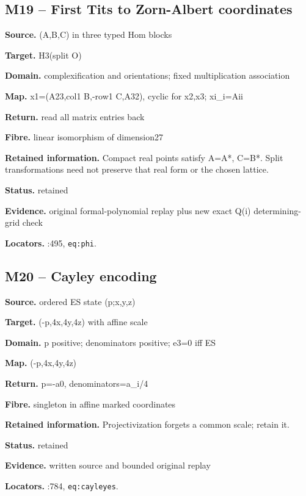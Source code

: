 \subsection*{M19 -- First Tits to Zorn-Albert coordinates}
\noindent\textbf{Source.} (A,B,C) in three typed Hom blocks\par
\noindent\textbf{Target.} H3(split O)\par
\noindent\textbf{Domain.} complexification and orientations; fixed multiplication association\par
\noindent\textbf{Map.} x1=(A23,col1 B,-row1 C,A32), cyclic for x2,x3; xi\_i=Aii\par
\noindent\textbf{Return.} read all matrix entries back\par
\noindent\textbf{Fibre.} linear isomorphism of dimension27\par
\noindent\textbf{Retained information.} Compact real points satisfy A=A*, C=B*. Split transformations need not preserve that real form or the chosen lattice.\par
\noindent\textbf{Status.} retained\par
\noindent\textbf{Evidence.} original formal-polynomial replay plus new exact Q(i) determining-grid check\par
\noindent\textbf{Locators.} :495, \texttt{eq:phi}.
\subsection*{M20 -- Cayley encoding}
\noindent\textbf{Source.} ordered ES state (p;x,y,z)\par
\noindent\textbf{Target.} (-p,4x,4y,4z) with affine scale\par
\noindent\textbf{Domain.} p positive; denominators positive; e3=0 iff ES\par
\noindent\textbf{Map.} (-p,4x,4y,4z)\par
\noindent\textbf{Return.} p=-a0, denominators=a\_i/4\par
\noindent\textbf{Fibre.} singleton in affine marked coordinates\par
\noindent\textbf{Retained information.} Projectivization forgets a common scale; retain it.\par
\noindent\textbf{Status.} retained\par
\noindent\textbf{Evidence.} written source and bounded original replay\par
\noindent\textbf{Locators.} :784, \texttt{eq:cayleyes}.
